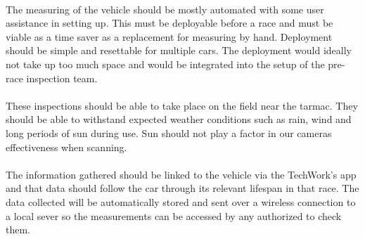 \documentclass[a4paper, 10pt, onecolumn]{article}
\begin{document}
\paragraph{} The measuring of the vehicle should be mostly automated with some user assistance in setting up. This must be deployable before a race and must be viable as a time saver as a replacement for measuring by hand. Deployment should be simple and resettable for multiple cars. The deployment would ideally not take up too much space and would be integrated into the setup of the pre-race inspection team. 

\paragraph{} These inspections should be able to take place on the field near the tarmac. They should be able to withstand expected weather conditions such as rain, wind and long periods of sun during use. Sun should not play a factor in our cameras effectiveness when scanning.  

\paragraph{} The information gathered should be linked to the vehicle via the TechWork’s app and that data should follow the car through its relevant lifespan in that race. The data collected will be automatically stored and sent over a wireless connection to a local sever so the measurements can be accessed by any authorized to check them. 

 
\end{document}
